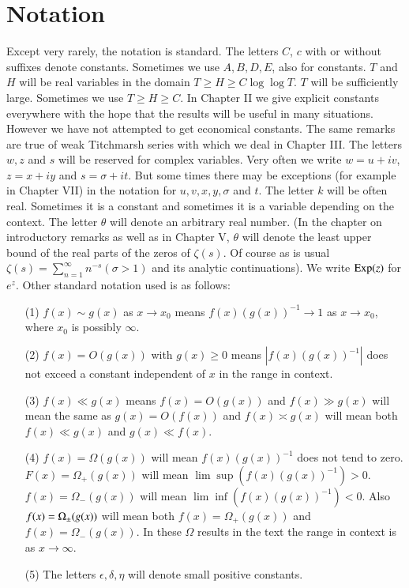 \chapter{Notation}

Except very rarely, the notation is standard. The letters $C$, $c$ with or without suffixes denote constants. Sometimes we use $A,B,D,E$, also for constants. $T$ and $H$ will be real variables in the domain $T \geq H \geq C \log \log T$. $T$ will be sufficiently large. Sometimes we use $T \geq H \geq C$. In Chapter II we give explicit constants everywhere with the hope that the results will be useful in many situations. However we have not attempted to get economical constants. The same remarks are true of weak Titchmarsh series with which we deal in Chapter III. The letters $w,z$ and $s$ will be reserved for complex variables. Very often we write $w = u + iv$, $z = x + iy$ and $s = \sigma + it$. But some times there may be exceptions (for example in Chapter VII) in the notation for $u,v,x,y,\sigma$ and $t$. The letter $k$ will be often real. Sometimes it is a constant and sometimes it is a variable depending on the context. The letter $\theta$ will denote an arbitrary real number. (In the chapter on introductory remarks as well as in Chapter V, $\theta$ will denote the least upper bound of the real parts of the zeros of $\zeta(s)$. Of course as is usual $\zeta(s) = \sum\limits^{\infty}_{n=1} n^{-s} (\sigma > 1)$ and its analytic continuations). We write $\operatorname{Exp} (z)$ for $e^z$. Other standard notation used is as follows:
\begin{enumerate}
\item[{\rm (1)}] $f(x) \sim g(x)$ as $x \to x_0$ means $f(x) (g(x))^{-1} \to 1$ as $x \to x_0$, where $x_0$ is possibly $\infty$.

\item[{\rm (2)}] $f(x) = O(g(x))$ with $g(x) \geq 0$ means $|f(x)(g(x))^{-1}|$ does not exceed a constant independent of $x$ in the range in context.

\item[{\rm (3)}] $f(x) \ll g (x)$ means $f(x) = O(g(x))$ and $f(x) \gg g(x)$ will mean the same as $g(x) = O(f(x))$ and $f(x) \asymp g(x)$ will mean both $f(x) \ll g(x)$ and $g(x) \ll f(x)$.

\item[{\rm (4)}] $f(x) = \Omega (g(x))$ will mean $f(x)(g(x))^{-1}$
  does not tend to zero. $F(x) = \Omega_+ (g(x))$ will mean $\lim \sup
  (f(x) (g(x))^{-1}) > 0$. $f(x) = \Omega_-(g(x))$  will mean $\lim
  \inf (f(x) (g(x))^{-1}) < 0$. Also $f(x) = \Omega_{\pm}\break (g(x))$ will
  mean both $f(x) = \Omega_+ (g(x))$ and $f(x) = \Omega_-(g(x))$. In
  these $\Omega$ results in the text the range in context is as $x \to
  \infty$. 

\item[{\rm (5)}] The letters $\epsilon, \delta, \eta$ will denote small positive constants.  
\end{enumerate}




